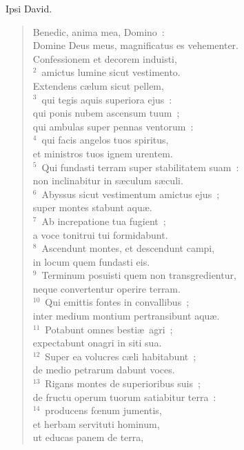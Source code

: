 \lettrine[lines=3,image=true,loversize=0.05,lraise=-0.03]{I}{}psi David. \begin{flushleft}\begin{verse}\vspace{6pt}Benedic, anima mea, Domino~:\\ Domine Deus meus, magnificatus es vehementer.\\ Confessionem et decorem induisti,\\
${}^{2}$~amictus lumine sicut vestimento.\\ Extendens c\ae lum sicut pellem,\\
${}^{3}$~qui tegis aquis superiora ejus~:\\ qui ponis nubem ascensum tuum~;\\ qui ambulas super pennas ventorum~:\\
${}^{4}$~qui facis angelos tuos spiritus,\\ et ministros tuos ignem urentem.\\
${}^{5}$~Qui fundasti terram super stabilitatem suam~:\\ non inclinabitur in s\ae culum s\ae culi.\\
${}^{6}$~Abyssus sicut vestimentum amictus ejus~;\\ super montes stabunt aqu\ae .\\
${}^{7}$~Ab increpatione tua fugient~;\\ a voce tonitrui tui formidabunt.\\
${}^{8}$~Ascendunt montes, et descendunt campi,\\ in locum quem fundasti eis.\\
${}^{9}$~Terminum posuisti quem non transgredientur,\\ neque convertentur operire terram.\\
${}^{10}$~Qui emittis fontes in convallibus~;\\ inter medium montium pertransibunt aqu\ae .\\
${}^{11}$~Potabunt omnes besti\ae\ agri~;\\ expectabunt onagri in siti sua.\\
${}^{12}$~Super ea volucres c\ae li habitabunt~;\\ de medio petrarum dabunt voces.\\
${}^{13}$~Rigans montes de superioribus suis~;\\ de fructu operum tuorum satiabitur terra~:\\
${}^{14}$~producens fœnum jumentis,\\ et herbam servituti hominum,\\ ut educas panem de terra,\\

\end{verse}
\end{flushleft}
